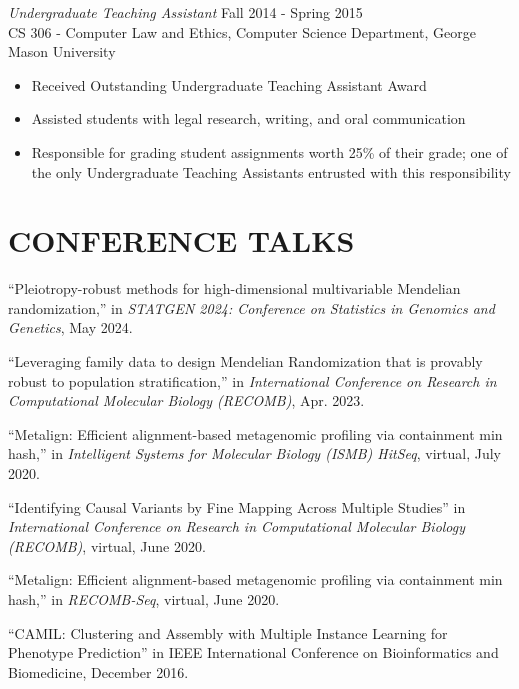 \documentclass[margin, 10pt]{res} %
\begin{document}
\begin{resume}
{\sl Undergraduate Teaching Assistant} \hfill Fall 2014 - Spring 2015 \\
CS 306 - Computer Law and Ethics, Computer Science Department, George Mason University
\begin{itemize} \itemsep -2pt %
\item Received Outstanding Undergraduate Teaching Assistant Award 
\item Assisted students with legal research, writing, and oral communication
\item Responsible for grading student assignments worth 25\% of their grade; one of the only Undergraduate Teaching Assistants entrusted with this responsibility
\end{itemize} 




\section{CONFERENCE TALKS}

``Pleiotropy-robust methods for high-dimensional multivariable Mendelian randomization,'' in {\sl STATGEN 2024: Conference on Statistics in Genomics and Genetics}, May 2024.

``Leveraging family data to design Mendelian Randomization that is provably robust to population stratification,'' in {\sl International Conference on Research in Computational Molecular Biology (RECOMB)}, Apr. 2023.

``Metalign: Efficient alignment-based metagenomic profiling via containment min hash,'' in {\sl Intelligent Systems for Molecular Biology (ISMB) HitSeq}, virtual, July 2020.

``Identifying Causal Variants by Fine Mapping Across Multiple Studies'' in {\sl International Conference on Research in Computational Molecular Biology (RECOMB)}, virtual, June 2020.

``Metalign: Efficient alignment-based metagenomic profiling via containment min hash,'' in {\sl RECOMB-Seq}, virtual, June 2020.

``CAMIL: Clustering and Assembly with Multiple Instance Learning for Phenotype Prediction'' in IEEE International Conference on Bioinformatics and Biomedicine, December 2016.


\end{resume}
\end{document}
